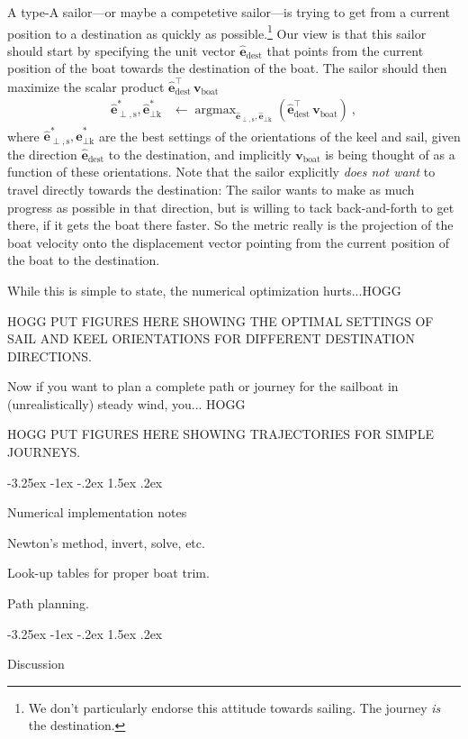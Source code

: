 \documentclass{article}
\makeatletter
\DeclareMathOperator*{\argmax}{argmax}
\renewcommand{\vec}[1]{\boldsymbol{#1}}
\newcommand{\uvec}{\vec{\hat{e}}}
\newcommand{\boat}{\text{boat}}
\newcommand{\destination}{\text{dest}}
\newcommand{\sail}{\text{s}}
\newcommand{\keel}{\text{k}}
\newcommand{\vboat}{\vec{v}_\boat}
\renewcommand\section{\@startsection {section}{1}{\z@}%
  {-3.25ex \@plus -1ex \@minus -.2ex}%
  {1.5ex \@plus .2ex}%
  {\raggedright\normalfont\large\bfseries}}
\makeatother
\begin{document}
A type-A sailor---or maybe a competetive sailor---is trying to get from a current position to a destination as quickly as possible.\footnote{We don't particularly endorse this attitude towards sailing. The journey \emph{is} the destination.}
Our view is that this sailor should start by specifying the unit vector $\uvec_\destination$ that points from the current position of the boat towards the destination of the boat.
The sailor should then maximize the scalar product $\uvec_\destination^\top\,\vboat$
\begin{align}
    \uvec_{\perp,\sail}^\ast,\uvec_{\perp\keel}^\ast &\leftarrow \argmax_{\uvec_{\perp,\sail},\uvec_{\perp\keel}} (\uvec_\destination^\top\,\vboat) ~,
\end{align}
where $\uvec_{\perp,\sail}^\ast,\uvec_{\perp\keel}^\ast$ are the best settings of the orientations of the keel and sail, given the direction $\uvec_\destination$ to the destination, and implicitly $\vboat$ is being thought of as a function of these orientations.
Note that the sailor explicitly \emph{does not want} to travel directly towards the destination:
The sailor wants to make as much progress as possible in that direction, but is willing to tack back-and-forth to get there, if it gets the boat there faster.
So the metric really is the projection of the boat velocity onto the displacement vector pointing from the current position of the boat to the destination.

While this is simple to state, the numerical optimization hurts...HOGG

HOGG PUT FIGURES HERE SHOWING THE OPTIMAL SETTINGS OF SAIL AND KEEL ORIENTATIONS FOR DIFFERENT DESTINATION DIRECTIONS.

Now if you want to plan a complete path or journey for the sailboat in (unrealistically) steady wind, you... HOGG

HOGG PUT FIGURES HERE SHOWING TRAJECTORIES FOR SIMPLE JOURNEYS.

\section{Numerical implementation notes}\label{sec:implementation}

Newton's method, invert, solve, etc.

Look-up tables for proper boat trim.

Path planning.

\section{Discussion}\label{sec:discussion}
\end{document}

